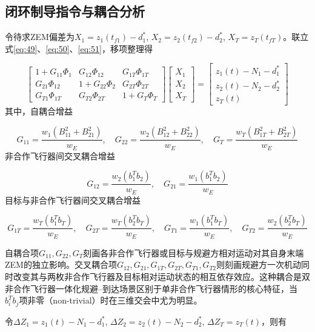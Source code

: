 \subsection{闭环制导指令与耦合分析}
令待求ZEM偏差为${X_1} = {z_1}({t_{f1}}) - d_1^*$, ${X_2} = {z_2}({t_{f2}}) - d_2^*$, ${X_T} = {z_T}({t_{fT}})$。联立式\eqref{eq:49}、\eqref{eq:50}、\eqref{eq:51}，移项整理得

\begin{equation}
\label{eq:56}
\left[ {\begin{array}{*{20}{c}}
  {1 + {G_{11}}{\Phi _1}}&{{G_{12}}{\Phi _{12}}}&{{G_{1T}}{\Phi _{1T}}} \\ 
  {{G_{21}}{\Phi _{12}}}&{1 + {G_{22}}{\Phi _2}}&{{G_{2T}}{\Phi _{2T}}} \\ 
  {{G_{T1}}{\Phi _{1T}}}&{{G_{T2}}{\Phi _{2T}}}&{1 + {G_T}{\Phi _T}} 
\end{array}} \right]
\begin{bmatrix}
  {X_1} \\
  {X_2} \\
  {X_T}
\end{bmatrix}
=
\begin{bmatrix}
  {z_1}(t) - {N_1} - d_1^* \\
  {z_2}(t) - {N_2} - d_2^* \\
  {z_T}(t)
\end{bmatrix}
\end{equation}
其中，自耦合增益

\begin{equation}
\label{eq:57}
{G_{11}} = \frac{{{w_1}(B_{11}^2 + B_{21}^2)}}{{{w_E}}},\quad {G_{22}} = \frac{{{w_2}(B_{12}^2 + B_{22}^2)}}{{{w_E}}},\quad {G_T} = \frac{{{w_T}(B_{1T}^2 + B_{2T}^2)}}{{{w_E}}}
\end{equation}
非合作飞行器间交叉耦合增益

\begin{equation}
\label{eq:58}
{G_{12}} = \frac{{{w_2}(b_1^T{b_2})}}{{{w_E}}},\quad {G_{21}} = \frac{{{w_1}(b_1^T{b_2})}}{{{w_E}}}
\end{equation}
目标与非合作飞行器间交叉耦合增益

\begin{equation}
\label{eq:59}
{G_{1T}} = \frac{{{w_T}(b_1^T{b_T})}}{{{w_E}}},\quad {G_{2T}} = \frac{{{w_T}(b_2^T{b_T})}}{{{w_E}}},\quad {G_{T1}} = \frac{{{w_1}(b_1^T{b_T})}}{{{w_E}}},\quad {G_{T2}} = \frac{{{w_2}(b_2^T{b_T})}}{{{w_E}}}
\end{equation}
\begin{remark}
自耦合项${G_{11}},{G_{22}},{G_T}$刻画各非合作飞行器或目标与规避方相对运动对其自身末端ZEM的独立影响。交叉耦合项${G_{12}},{G_{21}},{G_{1T}},{G_{2T}},{G_{T1}},{G_{T2}}$则刻画规避方一次机动同时改变其与两枚非合作飞行器及目标相对运动状态的相互依存效应。这种耦合是双非合作飞行器一体化规避–到达场景区别于单非合作飞行器情形的核心特征，当$b_i^T{b_j}$项非零（non-trivial）时在三维交会中尤为明显。
\end{remark}
令$\Delta {Z_1} = {z_1}(t) - {N_1} - d_1^*$, $\Delta {Z_2} = {z_2}(t) - {N_2} - d_2^*$, $\Delta {Z_T} = {z_T}(t)$，则有

